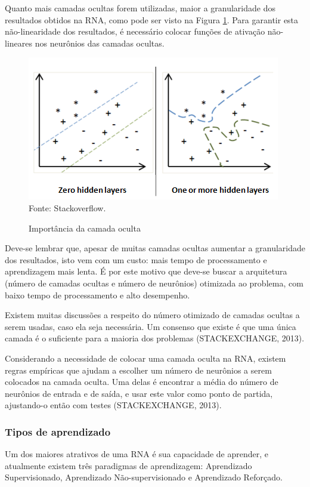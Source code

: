 \documentclass[12pt,a4paper]{article}
\newcommand{\source}[1]{\small Fonte: {#1}}
\begin{document}
	Quanto mais camadas ocultas forem utilizadas,
	maior a granularidade dos resultados obtidos na RNA,
	como pode ser visto na Figura \ref{fig:nnhiddenlayer}.
	Para garantir esta não-linearidade dos resultados, %
	é necessário colocar funções de ativação não-lineares nos neurônios das camadas ocultas.
	
	\begin{figure}[ht!]
		\caption{Importância da camada oculta}
		\centering
		\includegraphics[scale=1.5]{HiddenLayers.png}\\
		\vspace{0.5mm}
		\source{Stackoverflow.}
		\label{fig:nnhiddenlayer}
	\end{figure}
	
	Deve-se lembrar que, apesar de muitas camadas ocultas aumentar a granularidade dos resultados,
	isto vem com um custo:
	mais tempo de processamento e
	aprendizagem mais lenta.
	É por este motivo que deve-se buscar a arquitetura (número de camadas ocultas e número de neurônios) otimizada ao problema,
	com baixo tempo de processamento e alto desempenho.
	
	Existem muitas discussões a respeito do número otimizado de camadas ocultas a serem usadas, caso ela seja necessária.
	Um consenso que existe é que uma única camada é o suficiente para a maioria dos problemas
	(STACKEXCHANGE, 2013).
	
	Considerando a necessidade de colocar uma camada oculta na RNA,
	existem regras empíricas que ajudam a escolher um número de neurônios a serem colocados na camada oculta.
	Uma delas é encontrar a média do número de neurônios de entrada e de saída,
	e usar este valor como ponto de partida,
	ajustando-o então com testes
	(STACKEXCHANGE, 2013).
	
	\subsubsection{Tipos de aprendizado}
	Um dos maiores atrativos de uma RNA é sua capacidade de aprender,
	e atualmente existem três paradigmas de aprendizagem:
	Aprendizado Supervisionado, Aprendizado Não-supervisionado e Aprendizado Reforçado.
	
\end{document}
